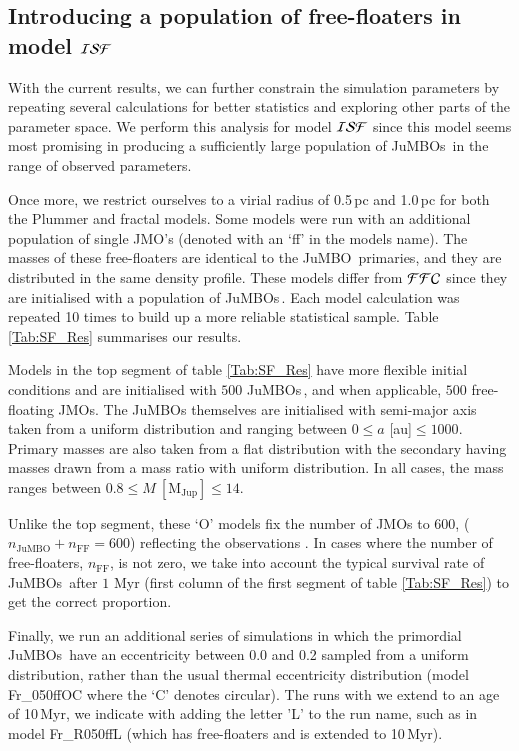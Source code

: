 \documentclass[submission,phys]{lib/SciPost}
\newcommand{\jumbo}{\mbox{JuMBO}}
\newcommand{\jumbos}{\mbox{JuMBOs}}
\begin{document}
\subsection{Introducing a population of free-floaters in model ${\cal ISF}$}\label{sect:ISF_explored}

With the current results, we can further constrain the simulation
parameters by repeating several calculations for better statistics and
exploring other parts of the parameter space.  We perform this
analysis for model ${\cal ISF}$ since this model seems most
promising in producing a sufficiently large population of \jumbos\,
in the range of observed parameters.

Once more, we restrict ourselves to a virial radius of 0.5\,pc and
1.0\,pc for both the Plummer and fractal models. Some models
were run with an additional population of single JMO's (denoted with an 
`ff' in the models name). The masses of these free-floaters are 
identical to the \jumbo\, primaries, and they are distributed in the same 
density profile. These models differ from ${\cal FFC}$ since they are 
initialised with a population of \jumbos\,. Each model calculation was 
repeated 10 times to build up a more reliable statistical sample. 
Table \ref{Tab:SF_Res} summarises our results.

Models in the top segment of table \ref{Tab:SF_Res} have more flexible
initial conditions and are initialised with $500$ \jumbos\,, and when
applicable, $500$ free-floating JMOs. The JuMBOs themselves are
initialised with semi-major axis taken from a uniform distribution and
ranging between $0\leq a$ [au]$\leq 1000$. Primary masses are also
taken from a flat distribution with the secondary having masses drawn
from a mass ratio with uniform distribution. In all cases, the mass
ranges between $0.8\leq M\ [\mathrm{M_{Jup}}]\leq 14$.

Unlike the top segment, these `O' models fix the number of JMOs to
$600$, ($n_{\mathrm{\jumbo}} + n_{\mathrm{FF}} = 600$) reflecting the
observations \cite{2023arXiv231001231P}. In cases where the number of
free-floaters, $n_{\mathrm{FF}}$, is not zero, we take into account
the typical survival rate of \jumbos\ after $1$ Myr (first column of
the first segment of table \ref{Tab:SF_Res}) to get the correct
proportion.

Finally, we run an additional series of simulations in which the
primordial \jumbos\, have an eccentricity between 0.0 and 0.2 sampled
from a uniform distribution, rather than the usual thermal
eccentricity distribution (model Fr\_050ffOC where the `C' denotes
circular).  The runs with we extend to an age of 10\,Myr, we indicate
with adding the letter 'L' to the run name, such as in model
Fr\_R050ffL (which has free-floaters and is extended to 10\,Myr).
\end{document}
